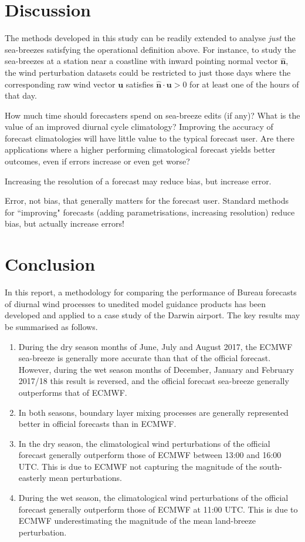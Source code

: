 \documentclass[alpha-refs]{wiley-article}
\begin{document}
\section{Discussion}
\label{discussion}

The methods developed in this study can be readily extended to analyse \emph{just} the sea-breezes satisfying the operational definition above. For instance, to study the sea-breezes at a station near a coastline with inward pointing normal vector $\widehat{\boldsymbol{n}}$, the wind perturbation datasets could be restricted to just those days where the corresponding raw wind vector $\boldsymbol{u}$ satisfies $\widehat{\boldsymbol{n}} \cdot \boldsymbol{u} > 0$ for at least one of the hours of that day.

How much time should forecasters spend on sea-breeze edits (if any)? What is the value of an improved diurnal cycle climatology? Improving the accuracy of forecast climatologies will have little value to the typical forecast user. Are there applications where a higher performing climatological forecast yields better outcomes, even if errors increase or even get worse? 

Increasing the resolution of a forecast may reduce bias, but increase error.  

Error, not bias, that generally matters for the forecast user. Standard methods for ``improving" forecasts (adding parametrisations, increasing resolution) reduce bias, but actually increase errors! 

\section{Conclusion}
\label{conclusion}
In this report, a methodology for comparing the performance of Bureau forecasts of diurnal wind processes to unedited model guidance products has been developed and applied to a case study of the Darwin airport. The key results may be summarised as follows.
\begin{enumerate}
\item
During the dry season months of June, July and August 2017, the ECMWF sea-breeze is generally more accurate than that of the official forecast. However, during the wet season months of December, January and February 2017/18 this result is reversed, and the official forecast sea-breeze generally outperforms that of ECMWF. 
\item
In both seasons, boundary layer mixing processes are generally represented better in official forecasts than in ECMWF.
\item
In the dry season, the climatological wind perturbations of the official forecast generally outperform those of ECMWF between 13:00 and 16:00 UTC. This is due to ECMWF not capturing the magnitude of the south-easterly mean perturbations. 
\item
During the wet season, the climatological wind perturbations of the official forecast generally outperform those of ECMWF at 11:00 UTC. This is due to ECMWF underestimating the magnitude of the mean land-breeze perturbation.
\end{enumerate}    
\end{document}
